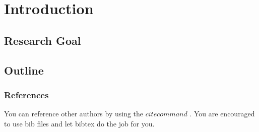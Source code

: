\chapter{Introduction} \label{chap:intro}

\section{Research Goal}\label{sect:thefirst}
\section{Outline}


\subsection{References}
You can reference other authors by using the $cite command$
\cite{Pokorski:1998hr} \cite{Ghilencea:1998st}. You are encouraged to use bib files and
let bibtex do the job for you.

